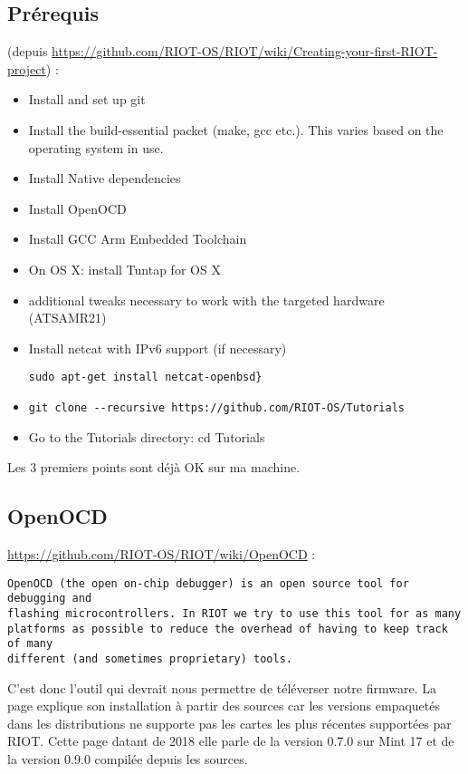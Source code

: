 \subsection{Prérequis}
(depuis \url{https://github.com/RIOT-OS/RIOT/wiki/Creating-your-first-RIOT-project}) :
\begin{itemize}
	\item Install and set up git
	\item Install the build-essential packet (make, gcc etc.). This varies based on
			the operating system in use.
	\item Install Native dependencies
	\item Install OpenOCD
	\item Install GCC Arm Embedded Toolchain
	\item On OS X: install Tuntap for OS X
	\item additional tweaks necessary to work with the targeted hardware (ATSAMR21)
	\item Install netcat with IPv6 support (if necessary)
			\begin{verbatim}sudo apt-get install netcat-openbsd}\end{verbatim}
	\item \begin{verbatim}git clone --recursive https://github.com/RIOT-OS/Tutorials\end{verbatim}
	\item Go to the Tutorials directory: cd Tutorials\\
\end{itemize}

Les 3 premiers points sont déjà OK sur ma machine.
\subsection{OpenOCD}

\url{https://github.com/RIOT-OS/RIOT/wiki/OpenOCD} :
\begin{verbatim}
OpenOCD (the open on-chip debugger) is an open source tool for debugging and
flashing microcontrollers. In RIOT we try to use this tool for as many
platforms as possible to reduce the overhead of having to keep track of many
different (and sometimes proprietary) tools.
\end{verbatim}

C'est donc l'outil qui devrait nous permettre de téléverser notre firmware. La page
explique son installation à partir des sources car les versions empaquetés dans les
distributions ne supporte pas les cartes les plus récentes supportées par RIOT. Cette
page datant de 2018 elle parle de la version 0.7.0 sur Mint 17 et de la version 0.9.0
compilée depuis les sources.\\


